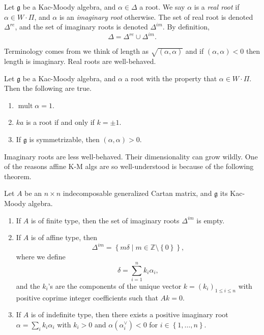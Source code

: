 \documentclass[11pt, letterpaper]{article}
\theoremstyle{plain}
\begin{document}
\begin{definition}\label{dfn:6-17}
	Let $\mathfrak{g} $ be a Kac-Moody algebra, and $\alpha \in \Delta $ a root. We say $\alpha $ is a \emph{real root} if $\alpha \in W\cdot \Pi $, and $\alpha $ is an \emph{imaginary root} otherwise. The set of real root is denoted $\Delta ^{re} $, and the set of imaginary roots is denoted $\Delta ^{i m} $. By definition,
	\[
		\Delta =\Delta ^{re} \cup \Delta ^{i m} 
	.\]
\end{definition}

Terminology comes from we think of length as $\sqrt{(\alpha ,\alpha )} $ and if $(\alpha ,\alpha )<0$ then length is imaginary. Real roots are well-behaved.

\begin{proposition}\label{prp:6-18}
	Let $\mathfrak{g} $ be a Kac-Moody algebra, and $\alpha $ a root with the property that $\alpha \in W\cdot \Pi $. Then the following are true.
	\begin{enumerate}[align=left, label=(\arabic*)]
		\item $\operatorname{mult} \alpha =1$.
		\item $ka$ is a root if and only if $k=\pm 1$.
		\item If $\mathfrak{g} $ is symmetrizable, then $(\alpha ,\alpha )>0$.
	\end{enumerate}
\end{proposition}

Imaginary roots are less well-behaved. Their dimensionality can grow wildly. One of the reasons affine K-M algs are so well-understood is because of the following theorem.

\begin{theorem}\label{thm:5-5}
	Let $A$ be an $n\times n$ indecomposable generalized Cartan matrix, and $\mathfrak{g} $ its Kac-Moody algebra.
	\begin{enumerate}[align=left, label=(\arabic*)]
		\item If $A$ is of finite type, then the set of imaginary roots $\Delta ^{im} $ is empty.
		\item If $A$ is of affine type, then
			\[
				\Delta ^{im} =\left\{ m\delta \mid m\in\mathbb{Z} \setminus \left\{ 0 \right\}  \right\} ,
			\]
			where we define
			\[
				\delta  = \sum_{i=1}^{n} k_i \alpha _i,
			\]
	and the $k_i$'s are the components of the unique vector $k=(k_i)_{1\leq i\leq n}$ with positive coprime integer coefficients such that $Ak=0$.
		\item If $A$ is of indefinite type, then there exists a positive imaginary root $\alpha =\sum_{i} k_i\alpha _i$ with $k_i>0$ and $\alpha (\alpha _i^\vee )<0$ for $i\in \left\{ 1, \ldots ,n \right\} $.
	\end{enumerate}
\end{theorem}
\end{document}
